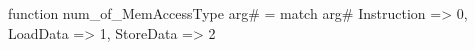 function num_of_MemAccessType arg# = match arg# {
  Instruction => 0,
  LoadData => 1,
  StoreData => 2
}
